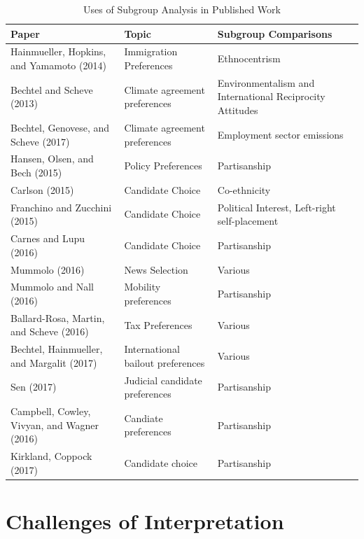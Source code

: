 \documentclass[a4paper,12pt]{article}\usepackage[]{graphicx}\usepackage[]{color}
\begin{document}
\begin{table}
\caption{Uses of Subgroup Analysis in Published Work}
\begin{center}
\footnotesize
\begin{tabular}{p{2.5in} p{2in} p{2in}}\toprule
\textbf{Paper} & \textbf{Topic} & \textbf{Subgroup Comparisons} \\ \midrule
Hainmueller, Hopkins, and Yamamoto (2014) & Immigration Preferences & Ethnocentrism \\
Bechtel and Scheve (2013) & Climate agreement preferences & Environmentalism and International Reciprocity Attitudes \\
Bechtel, Genovese, and Scheve (2017) & Climate agreement preferences & Employment sector emissions \\
Hansen, Olsen, and Bech (2015) & Policy Preferences & Partisanship \\
Carlson (2015) & Candidate Choice & Co-ethnicity \\
Franchino and Zucchini (2015) & Candidate Choice & Political Interest, Left-right self-placement\\
Carnes and Lupu (2016) & Candidate Choice & Partisanship \\
Mummolo (2016) & News Selection & Various\\
Mummolo and Nall (2016) & Mobility preferences & Partisanship \\
Ballard-Rosa, Martin, and Scheve (2016) & Tax Preferences & Various\\
Bechtel, Hainmueller, and Margalit (2017) & International bailout preferences & Various\\
Sen (2017) & Judicial candidate preferences & Partisanship \\
Campbell, Cowley, Vivyan, and Wagner (2016) & Candiate preferences & Partisanship \\
Kirkland, Coppock (2017) & Candidate choice & Partisanship \\ \bottomrule
\end{tabular}
\end{center}
\end{table}





\section{Challenges of Interpretation}

\end{document}
